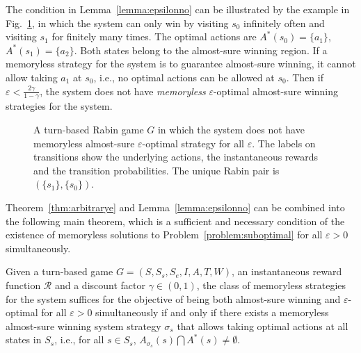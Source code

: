 \documentclass[runningheads,a4paper]{llncs}
\begin{document}
The condition in Lemma~\ref{lemma:epsilonno} can be illustrated by the example in Fig.~\ref{fig:counterexample}, in which the system can only win by visiting $s_0$ infinitely often and visiting $s_1$ for finitely many times. The optimal actions are $A^*(s_0) = \{a_1\}$, $A^*(s_1) = \{a_2\}$. 
Both states belong to the almost-sure winning region. If a memoryless strategy for the system is to guarantee almost-sure winning, it cannot allow taking $a_1$ at $s_0$, i.e., no optimal actions can be allowed at $s_0$. 
Then if $\varepsilon < \frac{2 \gamma}{1-\gamma}$,
the system does not have \emph{memoryless} $\varepsilon$-optimal almost-sure winning strategies for the system. 
\begin{figure}[t!]
\centering
{}
\caption{A turn-based Rabin game $G$ in which the system does not have memoryless almost-sure $\varepsilon$-optimal strategy for all $\varepsilon$. The labels on transitions show the underlying actions, the instantaneous rewards and the transition probabilities. The unique Rabin pair is $(\{s_1\}, \{s_0\})$. }
\label{fig:counterexample}
\end{figure}







Theorem~\ref{thm:arbitrarye} and Lemma~\ref{lemma:epsilonno} can be combined into the following main theorem, which is a sufficient and necessary condition of the existence of memoryless solutions to Problem~\ref{problem:suboptimal} for all $\varepsilon > 0$ simultaneously. 

\begin{theorem}
Given a turn-based game $G = (S, S_s, S_e, I, A, T, W)$, an instantaneous reward function $\mathcal{R}$ and a discount factor $\gamma \in (0,1)$, the class of memoryless strategies for the system suffices for the objective of being both almost-sure winning and $\varepsilon$-optimal for all $\varepsilon > 0$ simultaneously if and only if there exists a memoryless almost-sure winning system strategy $\sigma_s$ that allows taking optimal actions at all states in $S_s$, i.e., for all $s \in S_s$, $A_{\sigma_s}(s) \bigcap A^*(s) \not= \emptyset$.
\label{thm:main}
\end{theorem}
\end{document}
